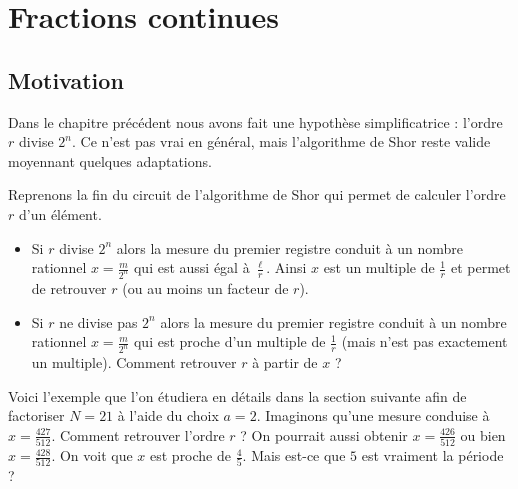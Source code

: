 \documentclass[11pt,class=report,crop=false]{standalone}
\begin{document}


\bigskip




\section{Fractions continues}


\subsection{Motivation}

Dans le chapitre précédent nous avons fait une hypothèse simplificatrice : l'ordre $r$ divise $2^n$. Ce n'est pas vrai en général, mais l'algorithme de Shor reste valide moyennant quelques adaptations.


Reprenons la fin du circuit de l'algorithme de Shor qui permet de calculer l'ordre $r$ d'un élément.
\begin{itemize}
  \item Si $r$ divise $2^n$ alors la mesure du premier registre conduit à un nombre rationnel $x = \frac{m}{2^n}$ qui est aussi égal à $\frac{\ell}{r}$.
  Ainsi $x$ est un multiple de $\frac 1r$ et permet de retrouver $r$ (ou au moins un facteur de $r$).
   
  \item Si $r$ ne divise pas $2^n$ alors la mesure du premier registre conduit à un nombre rationnel $x = \frac{m}{2^n}$ qui est proche d'un multiple de $\frac1r$ (mais n'est pas exactement un multiple). Comment retrouver $r$ à partir de $x$ ?
\end{itemize}


Voici l'exemple que l'on étudiera en détails dans la section suivante afin de factoriser
$N=21$ à l'aide du choix $a=2$. 
Imaginons qu'une mesure conduise à $x = \frac{427}{512}$. Comment retrouver l'ordre $r$ ? On pourrait aussi obtenir $x = \frac{426}{512}$ ou bien $x = \frac{428}{512}$.
On voit que $x$ est proche de $\frac45$. Mais est-ce que $5$ est vraiment la période ? 
\end{document}
